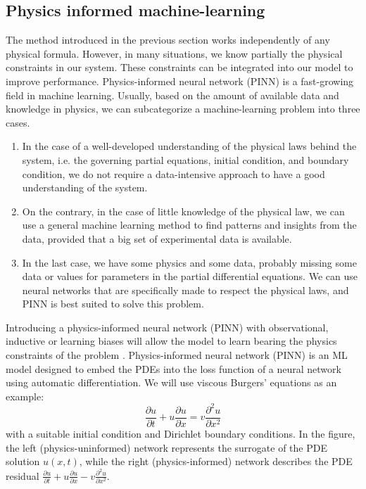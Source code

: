 \documentclass[aps,prb,twocolumn,superscriptaddress,floatfix]{revtex4-2}
\newcounter{para}
\begin{document}
\subsection{Physics informed machine-learning}
The method introduced in the previous section works independently of any physical formula. However, in many situations, we know partially the physical constraints in our system. These constraints can be integrated into our model to improve performance. Physics-informed neural network (PINN) is a fast-growing field in machine learning. Usually, based on the amount of available data and knowledge in physics, we can subcategorize a machine-learning problem into three cases.
\begin{enumerate}
    \item In the case of a well-developed understanding of the physical laws behind the system, i.e. the governing partial equations, initial condition, and boundary condition, we do not require a data-intensive approach to have a good understanding of the system.
    \item On the contrary, in the case of little knowledge of the physical law, we can use a general machine learning method to find patterns and insights from the data, provided that a big set of experimental data is available.
    \item In the last case, we have some physics and some data, probably missing some data or values for parameters in the partial differential equations. We can use neural networks that are specifically made to respect the physical laws, and PINN is best suited to solve this problem.
    \cite{2019JCoPh.378..686R}
\end{enumerate}
Introducing a physics-informed neural network (PINN) with observational, inductive or learning biases will allow the model to learn bearing the physics constraints of the problem\cite{benmoseleyWhatPhysicsinformed}
\cite{karniadakis2021physics}.
Physics-informed neural network (PINN) is an ML model designed to embed the PDEs into the loss function of a neural network using automatic differentiation. We will use viscous Burgers' equations as an example:
$$
\frac{\partial u}{\partial t}+u \frac{\partial u}{\partial x}=v \frac{\partial^2 u}{\partial x^2}
$$
with a suitable initial condition and Dirichlet boundary conditions. In the figure, the left (physics-uninformed) network represents the surrogate of the PDE solution $u(x, t)$, while the right (physics-informed) network describes the PDE residual $\frac{\partial u}{\partial t}+u \frac{\partial u}{\partial x}-v \frac{\partial^2 u}{\partial x^2}$. 
\end{document}
